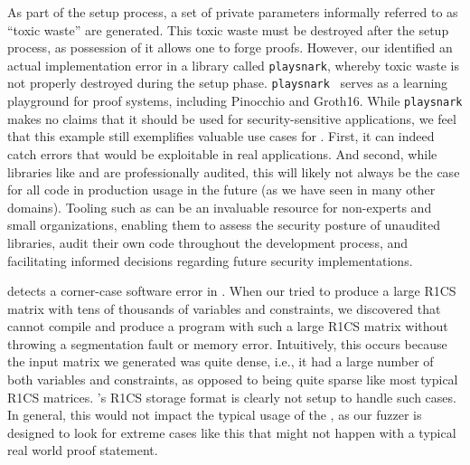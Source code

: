As part of the \zksnark setup process, a set of private parameters informally referred to as ``toxic waste'' are generated.  This toxic waste must be destroyed after the setup process, as possession of it allows one to forge proofs.
However, our \SnarkFuzzer identified an actual implementation error in a \zksnark library called \texttt{playsnark}, whereby toxic waste is not properly destroyed during the setup phase. \texttt{playsnark}~\cite{playsnark} serves as a learning playground for proof systems, including Pinocchio and Groth16.
While \texttt{playsnark} makes no claims that it should be used for security-sensitive applications, we feel that this example still exemplifies valuable use cases for \snarkprobe.  First, it can indeed catch errors that would be exploitable in real applications.  And second, while libraries like \bellman and \libsnark are professionally audited, this will likely not always be the case for all \zksnark code in production usage in the future (as we have seen in many other domains).  Tooling such as \snarkprobe can be an invaluable resource for non-experts and small organizations, enabling them to assess the security posture of unaudited \zksnark libraries, audit their own code throughout the development process, and facilitating informed decisions regarding future security implementations.


\SnarkFuzzer detects a corner-case software error in \libsnark. When our  tried to produce a large R1CS matrix with tens of thousands of variables and constraints, we discovered that \libsnark cannot compile and produce a \zksnark program with such a large R1CS matrix without throwing a segmentation fault or memory error.  Intuitively, this occurs because the input matrix we generated was quite dense, i.e., it had a large number of both variables and constraints, as opposed to being quite sparse like most typical R1CS matrices.  \libsnark's R1CS storage format is clearly not setup to handle such cases.  In general, this would not impact the typical usage of the \libsnark, as our fuzzer is designed to look for extreme cases like this that might not happen with a typical real world proof statement.

